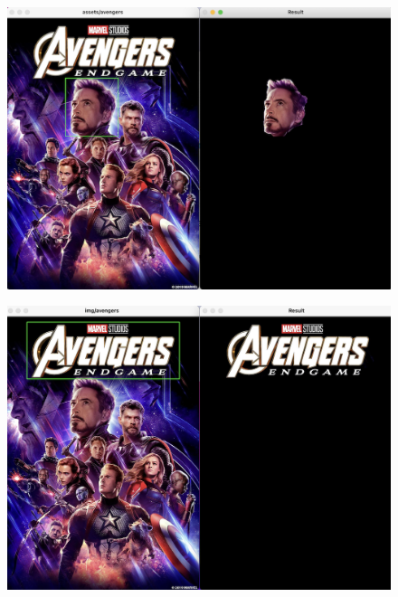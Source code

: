 \documentclass{article}
\begin{document}
\begin{figure}[H]
\includegraphics[scale=0.5]{test-avengers-1}
\centering
{}
\label{fig:test1}
\end{figure}

\begin{figure}[H]
\includegraphics[scale=0.5]{test-avengers-2}
\centering
{}
\label{fig:test2}
\end{figure}
\end{document}
